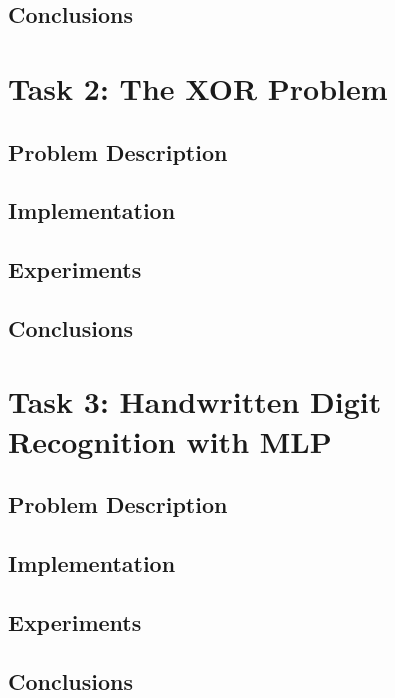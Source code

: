 \documentclass{article}
\begin{document}

\subsection{Conclusions}

\newpage
\section{Task 2: The XOR Problem}
\subsection{Problem Description}

\subsection{Implementation}

\subsection{Experiments}

\subsection{Conclusions}

\newpage
\section{Task 3: Handwritten Digit Recognition with MLP}
\subsection{Problem Description}

\subsection{Implementation}

\subsection{Experiments}

\subsection{Conclusions}
\end{document}
